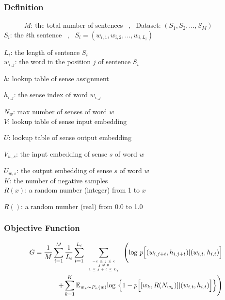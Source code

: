 \documentclass[12pt,a4paper,twoside]{book}
\begin{document}
\subsubsection{Definition}

\ \ \ \ \ \ $M$: the total number of sentences \ , \ Dataset: $(S_1,S_2,\ldots,S_M)$\\

$S_i$: the $i$th sentence \ , \ $S_i = (w_{i,1},w_{i,2},\ldots,w_{i,L_i})$

$L_i$: the length of sentence $S_i$\\

$w_{i,j}$: the word in the position $j$ of sentence $S_i$

$h$: lookup table of sense assignment

$h_{i,j}$: the sense index of word $w_{i,j}$ 

$N_w$: max number of senses of word $w$\\

$V$: lookup table of sense input embedding 

$U$: lookup table of  sense output embedding 

$V_{w,s}$: the input embedding of sense $s$ of word $w$

$U_{w,s}$: the output embedding of sense $s$ of word $w$\\

$K$: the number of negative samples\\

$R(x)$: a random number (integer) from 1 to $x$

$R()$: a random number (real) from 0.0 to 1.0
\subsubsection{Objective Function}
\begin{equation}
\begin{split}
G = \frac{1}{M}\sum_{i=1}^M\frac{1}{L_i}\sum_{t=1}^{L_i}\sum\limits_{\mbox{\tiny$\begin{array}{c}-c\leq j \leq c\\ j\neq 0\\ 1\leq j+t\leq L_i\end{array}$}}\Bigg (\mathrm{log}\ p\Big [(w_{i,j+t},h_{i,j+t})|(w_{i,t},h_{i,t})\Big ] \\
+\sum\limits_{k=1}^K\mathbb{E}_{w_k\sim P_n(w)}\mathrm{log}\ \Big \{1-p\Big[[w_k,R(N_{w_k})]|(w_{i,t},h_{i,t})\Big ] \Big \} \Bigg )
\end{split}
\end{equation} 
\end{document}
